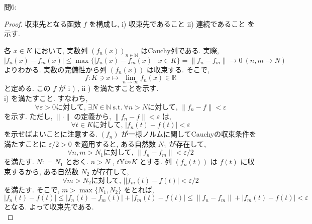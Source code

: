 \documentclass[dvipdfmx,uplatex,11pt]{jsarticle}
\theoremstyle{definition}
\begin{document}
\newpage

問6:\\
\dotfill
\begin{leftbar}
	\begin{proof}
	収束先となる函数 $f$ を構成し, i) 収束先であること ii) 連続であること  を示す. 
	
	各 $x \in K$ において, 実数列 $( f_n ( x ) ) _ {n \in \mathbb N}$ はCauchy列である. 実際, 
%		
		\[
			| f _n ( x ) - f _m ( x ) | \leq \max \{ | f_n ( x ) - f_m ( x ) \mid x \in K \} = \| f_n - f_m \| \to 0 \ ( n , m \to N )
		\]
%		
	よりわかる. 実数の完備性から列 $( f_n ( x ) )$ は収束する. そこで, 
%		
		\[
			f : K \ni x \mapsto \lim_{n \to \infty} f_n ( x ) \in \mathbb R
		\]
%		
	と定める. この $f$ が i ) , ii ) を満たすことを示す. \\
	i) を満たすこと. すなわち, 
%		
		\[
			\forall \varepsilon > 0 \text {に対して, } \exists N \in \mathbb N \ \mathrm{s.t.} \ \forall n > N \text {に対して, } \| f_n - f \| < \varepsilon
		\]
%
	を示す. ただし, $\| \cdot \|$ の定義から, $\| f_n - f \| < \varepsilon$ は, 
%		
		\[
			\forall t \in K \text {に対して, } | f_n ( t ) - f ( t ) | < \varepsilon
		\]
%		
	を示せばよいことに注意する. $( f_n )$ が一様ノルムに関してCauchyの収束条件を満たすことに $\varepsilon / 2 > 0$ を適用すると, ある自然数 $N_1$ が存在して, 
%		
		\[
			\forall n , m > N _1 \text {に対して, } \| f_n - f_m \| < \varepsilon / 2
		\]
%		
	を満たす. $N : = N_1$ とおく. $n > N$ , $t ¥in K$ とする. 列 $( f_n ( t ) )$ は $f (t)$ に収束するから, ある自然数 $N_2$ が存在して, 
%		
		\[
			\forall m > N_2 \text {に対して, }| | f_{m} ( t ) - f ( t ) | < \varepsilon / 2
		\] 
%		
	を満たす. そこで, $m > \max \{ N_1 , N_2 \}$ をとれば, 
%		
		\[
			| f_n ( t ) - f ( t ) | \leq | f_n ( t ) - f_m ( t ) | + | f _m ( t ) - f ( t ) | \leq \| f_n - f_m \| + | f_m ( t ) - f ( t ) | < \varepsilon
		\] 
%		
	となる. よって収束先である. \\
	

\end{proof}
\end{leftbar}
\end{document}
